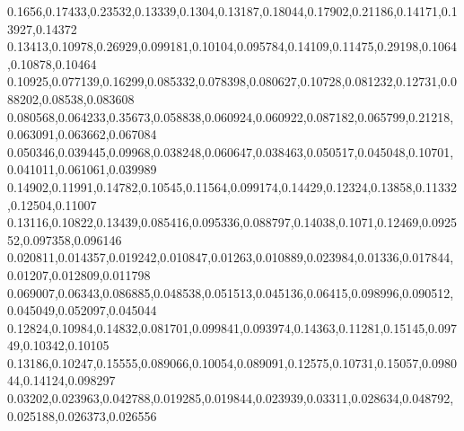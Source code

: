 0.1656,0.17433,0.23532,0.13339,0.1304,0.13187,0.18044,0.17902,0.21186,0.14171,0.13927,0.14372
0.13413,0.10978,0.26929,0.099181,0.10104,0.095784,0.14109,0.11475,0.29198,0.1064,0.10878,0.10464
0.10925,0.077139,0.16299,0.085332,0.078398,0.080627,0.10728,0.081232,0.12731,0.088202,0.08538,0.083608
0.080568,0.064233,0.35673,0.058838,0.060924,0.060922,0.087182,0.065799,0.21218,0.063091,0.063662,0.067084
0.050346,0.039445,0.09968,0.038248,0.060647,0.038463,0.050517,0.045048,0.10701,0.041011,0.061061,0.039989
0.14902,0.11991,0.14782,0.10545,0.11564,0.099174,0.14429,0.12324,0.13858,0.11332,0.12504,0.11007
0.13116,0.10822,0.13439,0.085416,0.095336,0.088797,0.14038,0.1071,0.12469,0.092552,0.097358,0.096146
0.020811,0.014357,0.019242,0.010847,0.01263,0.010889,0.023984,0.01336,0.017844,0.01207,0.012809,0.011798
0.069007,0.06343,0.086885,0.048538,0.051513,0.045136,0.06415,0.098996,0.090512,0.045049,0.052097,0.045044
0.12824,0.10984,0.14832,0.081701,0.099841,0.093974,0.14363,0.11281,0.15145,0.09749,0.10342,0.10105
0.13186,0.10247,0.15555,0.089066,0.10054,0.089091,0.12575,0.10731,0.15057,0.098044,0.14124,0.098297
0.03202,0.023963,0.042788,0.019285,0.019844,0.023939,0.03311,0.028634,0.048792,0.025188,0.026373,0.026556
